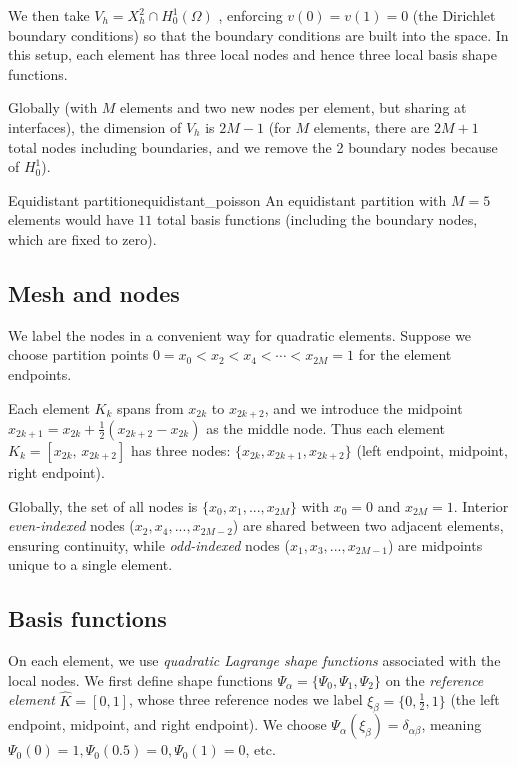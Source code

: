 \documentclass[a4paper,10pt]{article}
\begin{document}
We then take \(V_h = X_h^2 \cap H^1_0(\Omega)\) , enforcing \(v(0)=v(1)=0\) (the Dirichlet boundary conditions) so that the boundary conditions are built into the space.
In this setup, each element has three local nodes and hence three local basis shape functions.

Globally (with \(M\) elements and two new nodes per element, but sharing at interfaces), the dimension of \(V_h\) is \(2M-1\) (for \(M\) elements, there are \(2M+1\) total nodes including boundaries, and we remove the 2 boundary nodes because of \(H^1_0\)).

\begin{example}{Equidistant partition}{equidistant_poisson}
	An equidistant partition with \(M=5\) elements would have \(11\) total basis functions (including the boundary nodes, which are fixed to zero).
\end{example}

\subsection*{Mesh and nodes}
We label the nodes in a convenient way for quadratic elements.
Suppose we choose partition points \(0 = x_0 < x_2 < x_4 < \cdots < x_{2M} = 1\) for the element endpoints.

Each element \(K_k\) spans from \(x_{2k}\) to \(x_{2k+2}\), and we introduce the midpoint \(x_{2k+1} = x_{2k} + \frac{1}{2}(x_{2k+2}-x_{2k})\) as the middle node.
Thus each element \(K_k = [x_{2k},\,x_{2k+2}]\) has three nodes: \(\{x_{2k}, x_{2k+1}, x_{2k+2}\}\) (left endpoint, midpoint, right endpoint).

Globally, the set of all nodes is \(\{x_0, x_1, ..., x_{2M}\}\) with \(x_0=0\) and \(x_{2M}=1\).
Interior \emph{even-indexed} nodes (\(x_2, x_4, ..., x_{2M-2}\)) are shared between two adjacent elements, ensuring continuity, while \textit{odd-indexed} nodes (\(x_1, x_3, ..., x_{2M-1}\)) are midpoints unique to a single element.

\subsection*{Basis functions}
On each element, we use \emph{quadratic Lagrange shape functions} associated with the local nodes.
We first define shape functions \(\Psi_\alpha = \{\Psi_0, \Psi_1,\Psi_2\}\) on the \emph{reference element} \(\hat K = [0,1]\), whose three reference nodes we label \(\xi_\beta = \{0, \frac{1}{2}, 1\}\) (the left endpoint, midpoint, and right endpoint).
We choose \(\Psi_\alpha(\xi_\beta) = \delta_{\alpha\beta}\), meaning \(\Psi_0(0)=1, \Psi_0(0.5)=0, \Psi_0(1)=0\), etc.
\end{document}
